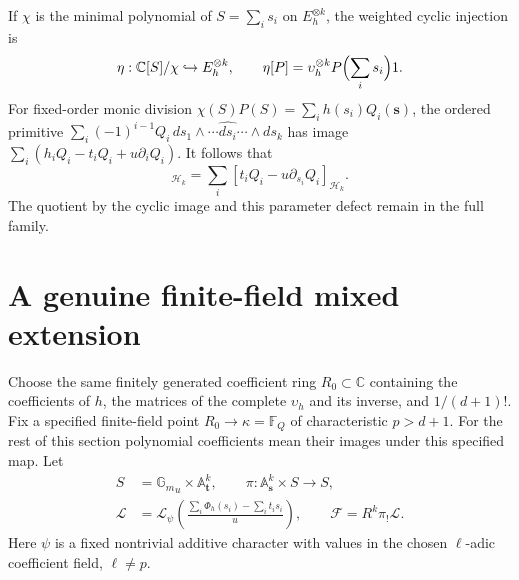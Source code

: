 \documentclass[11pt,a4paper]{article}
\newcommand{\C}{\mathbb C}
\newcommand{\F}{\mathbb F}
\newcommand{\A}{\mathbb A}
\newcommand{\Gm}{{\mathbb G_m}}
\newcommand{\HH}{\mathcal H}
\begin{document}
If $\chi$ is the minimal polynomial of $S=\sum_i s_i$ on
$E_h^{\otimes k}$, the weighted cyclic injection is
\begin{equation}
 \eta:\C[S]/\chi\hookrightarrow E_h^{\otimes k},\qquad
 \eta[P]=\upsilon_h^{\otimes k}P\Bigl(\sum_i s_i\Bigr)1.
 \label{BC:eq:eta}
\end{equation}
For fixed-order monic division
$\chi(S)P(S)=\sum_i h(s_i)Q_i(\mathbf s)$, the ordered primitive
$\sum_i(-1)^{i-1}Q_i\,ds_1\wedge\cdots\widehat{ds_i}\cdots\wedge ds_k$
has image $\sum_i(h_iQ_i-t_iQ_i+u\partial_iQ_i)$.
It follows that
\begin{equation}
 [\chi(S)P(S)]_{\HH_k}
    =\sum_i[t_iQ_i-u\partial_{s_i}Q_i]_{\HH_k}.
 \label{BC:eq:cyclic-defect}
\end{equation}
The quotient by the cyclic image and this parameter defect remain in
the full family.

\section{A genuine finite-field mixed extension}

Choose the same finitely generated coefficient ring $R_0\subset\C$
containing the coefficients of $h$, the matrices of the complete
$\upsilon_h$ and its inverse, and $1/(d+1)!$.  Fix a specified
finite-field point $R_0\to\kappa=\F_Q$ of characteristic $p>d+1$.
For the rest of this section polynomial coefficients mean their images
under this specified map.  Let
\begin{align}
 S&=\Gm_u\times\A^k_{\mathbf t},\qquad
 \pi:\A^k_{\mathbf s}\times S\longrightarrow S,\nonumber\\
 \mathcal L&=\mathcal L_\psi
       \left(\frac{\sum_i\Phi_h(s_i)-\sum_i t_i s_i}{u}\right),
       \qquad \mathcal F=R^k\pi_!\mathcal L.
 \label{BC:eq:finite-family}
\end{align}
Here $\psi$ is a fixed nontrivial additive character with values in the
chosen $\ell$-adic coefficient field, $\ell\ne p$.
\end{document}
